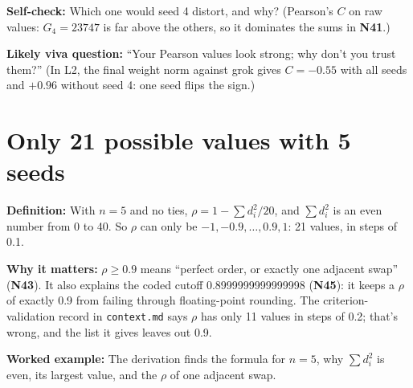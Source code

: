 \documentclass[11pt,a4paper,oneside,openany]{report}
\newcommand{\code}[1]{\texttt{#1}}
\newcommand{\gl}[1]{\textbf{#1}}   %
\newcommand{\fdef}{\textbf{Definition:} }
\newcommand{\fwhy}{\par\textbf{Why it matters:} }
\newcommand{\fex}{\par\textbf{Worked example:} }
\newcommand{\fself}{\par\textbf{Self-check:} }
\newcommand{\fviva}{\par\textbf{Likely viva question:} }
\begin{document}
\fself Which one would seed 4 distort, and why? (Pearson's $C$ on raw values: $G_4 = 23747$ is far above the others, so it dominates the sums in \gl{N41}.)
\fviva ``Your Pearson values look strong; why don't you trust them?'' (In L2, the final weight norm against grok gives $C = -0.55$ with all seeds and $+0.96$ without seed 4: one seed flips the sign.)

\section{Only 21 possible values with 5 seeds}
\fdef With $n = 5$ and no ties, $\rho = 1 - \sum d_i^2 / 20$, and $\sum d_i^2$ is an even number from 0 to 40. So $\rho$ can only be $-1, -0.9, \ldots, 0.9, 1$: 21 values, in steps of 0.1.
\fwhy $\rho \ge 0.9$ means ``perfect order, or exactly one adjacent swap'' (\gl{N43}). It also explains the coded cutoff 0.8999999999999998 (\gl{N45}): it keeps a $\rho$ of exactly 0.9 from failing through floating-point rounding. The criterion-validation record in \code{context.md} says $\rho$ has only 11 values in steps of 0.2; that's wrong, and the list it gives leaves out 0.9.
\fex The derivation finds the formula for $n = 5$, why $\sum d_i^2$ is even, its largest value, and the $\rho$ of one adjacent swap.
\end{document}
